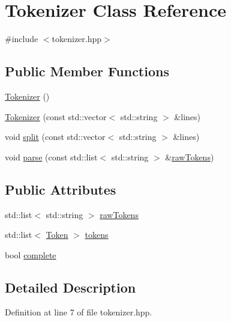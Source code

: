 \hypertarget{class_tokenizer}{}\section{Tokenizer Class Reference}
\label{class_tokenizer}


{\ttfamily \#include $<$tokenizer.\+hpp$>$}

\subsection*{Public Member Functions}
\begin{DoxyCompactItemize}
\item 
\hyperlink{class_tokenizer_a2a6c04ea8c784f66bebcb6df7073769c}{Tokenizer} ()
\item 
\hyperlink{class_tokenizer_a6edc9ba4af94d2aa55f48a83c903800f}{Tokenizer} (const std\+::vector$<$ std\+::string $>$ \&lines)
\item 
void \hyperlink{class_tokenizer_a8bd8a4eb5df764f6128028daa0e9044b}{split} (const std\+::vector$<$ std\+::string $>$ \&lines)
\item 
void \hyperlink{class_tokenizer_ae928efe72c00908a3529747b4cfd01d5}{parse} (const std\+::list$<$ std\+::string $>$ \&\hyperlink{class_tokenizer_a89707ad3a758fc9ec58f00d92d5fc622}{raw\+Tokens})
\end{DoxyCompactItemize}
\subsection*{Public Attributes}
\begin{DoxyCompactItemize}
\item 
std\+::list$<$ std\+::string $>$ \hyperlink{class_tokenizer_a89707ad3a758fc9ec58f00d92d5fc622}{raw\+Tokens}
\item 
std\+::list$<$ \hyperlink{struct_token}{Token} $>$ \hyperlink{class_tokenizer_ae547093dbd03b3e70373147e4669d9fa}{tokens}
\item 
bool \hyperlink{class_tokenizer_a330a4cce0cbf3ebfbe601d97022d1ed4}{complete}
\end{DoxyCompactItemize}


\subsection{Detailed Description}


Definition at line 7 of file tokenizer.\+hpp.



